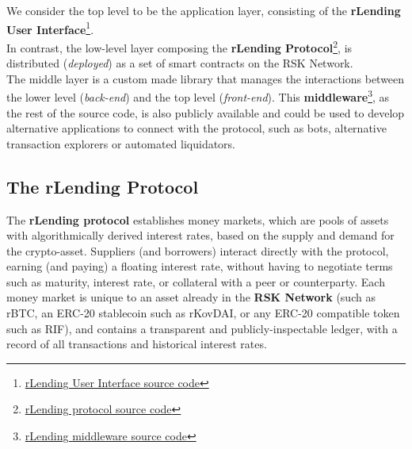 \documentclass{article}
\begin{document}
We consider the top level to be the application layer, consisting of the \textbf{rLending User Interface}\footnote{\href{https://github.com/riflending/rlending-ui}{rLending User Interface source code}}.
\\
In contrast, the low-level layer composing the \textbf{rLending Protocol}\footnote{\href{https://github.com/riflending/rlending-protocol}{rLending protocol source code}}, is distributed (\textit{deployed}) as a set of smart contracts on the RSK Network.
\\ 
The middle layer is a custom made library that manages the interactions between the lower level (\textit{back-end}) and the top level (\textit{front-end}). This \textbf{middleware}\footnote{\href{https://github.com/riflending/rlending-ui/src/components/middleware}{rLending middleware source code}}, as the rest of the source code, is also publicly available and could be used to develop alternative applications to connect with the protocol, such as bots, alternative transaction explorers or automated liquidators.

\subsection{The rLending Protocol}

The \textbf{rLending protocol} establishes money markets, which are pools of assets with algorithmically derived interest rates, based on the supply and demand for the
crypto-asset. Suppliers (and borrowers) interact directly with the protocol, earning (and paying) a floating interest rate, without having to negotiate terms such as maturity, interest rate, or collateral with a peer or counterparty. 
Each money market is unique to an asset already in the \textbf{RSK Network} (such as rBTC, an ERC-20 stablecoin such as rKovDAI, or any ERC-20 compatible token such as RIF), and contains a transparent and publicly-inspectable ledger, with a record of all transactions and historical interest rates.

\end{document}

